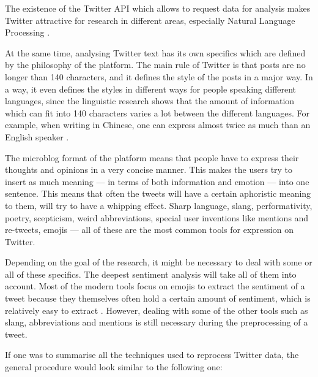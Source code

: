 The existence of the Twitter API which allows to request data for analysis makes Twitter attractive for research in different areas, especially Natural Language Processing \cite{twitterapi}. 

At the same time, analysing Twitter text has its own specifics which are defined by the philosophy of the platform. The main rule of Twitter is that posts are no longer than 140 characters, and it defines the style of the posts in a major way. In a way, it even defines the styles in different ways for people speaking different languages, since the linguistic research shows that the amount of information which can fit into 140 characters varies a lot between the different languages. For example, when writing in Chinese, one can express almost twice as much than an English speaker \cite{neubig2013much}. 

The microblog format of the platform means that people have to express their thoughts and opinions in a very concise manner. This makes the users try to insert as much meaning --- in terms of both information and emotion --- into one sentence. This means that often the tweets will have a certain aphoristic meaning to them, will try to have a whipping effect. Sharp language, slang, performativity, poetry, scepticism, weird abbreviations, special user inventions like mentions and re-tweets, emojis --- all of these are the most common tools for expression on Twitter. 

Depending on the goal of the research, it might be necessary to deal with some or all of these specifics. The deepest sentiment analysis will take all of them into account. Most of the modern tools focus on emojis to extract the sentiment of a tweet because they themselves often hold a certain amount of sentiment, which is relatively easy to extract \cite{novak2015sentiment}. However, dealing with some of the other tools such as slang, abbreviations and mentions is still necessary during the preprocessing of a tweet.

If one was to summarise all the techniques used to reprocess Twitter data, the general procedure would look similar to the following one:

